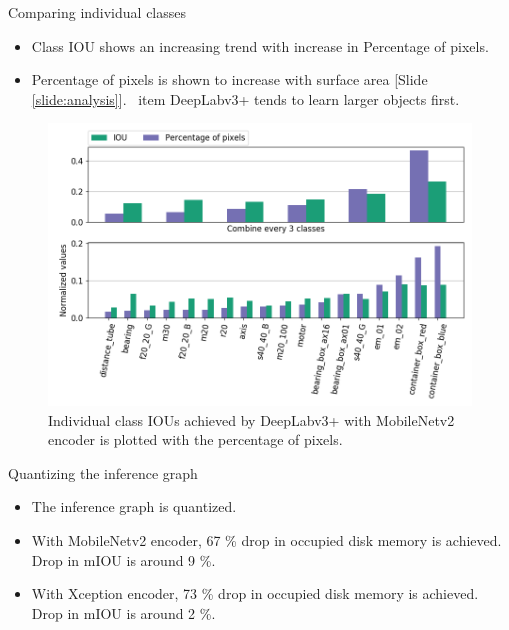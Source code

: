 \documentclass{beamer}
\begin{document}
\begin{frame}{Comparing individual classes}
	\begin{small}
		\begin{itemize}
			\item Class IOU shows an increasing trend with increase in Percentage of pixels.
			\item Percentage of pixels is shown to increase with surface area [Slide \ref{slide:analysis}].
		\	item DeepLabv3+ tends to learn larger objects first.
		\end{itemize}
	\end{small}

	\begin{figure}[h]
		\centering
		\includegraphics[width=0.57\linewidth]{images/cls_iou_full}
		\captionsetup{justification=centering,margin=0.2cm}
		\caption{Individual class IOUs achieved by DeepLabv3+ with MobileNetv2 encoder is plotted with the percentage of pixels.}
		\label{Fig:variants}
	\end{figure}

\end{frame}


\begin{frame}{Quantizing the inference graph}
	\begin{small}
		\begin{itemize}
			\item The inference graph is quantized.
			\item With MobileNetv2 encoder, 67 \% drop in occupied disk memory is achieved. Drop in mIOU is around 9 \%.
			\item With Xception encoder, 73 \% drop in occupied disk memory is achieved. Drop in mIOU is around 2 \%.
		\end{itemize}
	\end{small}
	
	
\end{frame}
\end{document}
